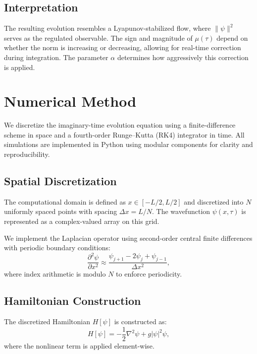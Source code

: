 \documentclass[12pt]{article}
\begin{document}
\subsection*{Interpretation}

The resulting evolution resembles a Lyapunov-stabilized flow, where $\|\psi\|^2$ serves as the regulated observable. The sign and magnitude of $\mu(\tau)$ depend on whether the norm is increasing or decreasing, allowing for real-time correction during integration. The parameter $\alpha$ determines how aggressively this correction is applied.

\section{Numerical Method}

We discretize the imaginary-time evolution equation using a finite-difference scheme in space and a fourth-order Runge--Kutta (RK4) integrator in time. All simulations are implemented in Python using modular components for clarity and reproducibility.

\subsection*{Spatial Discretization}

The computational domain is defined as $x \in [-L/2, L/2]$ and discretized into $N$ uniformly spaced points with spacing $\Delta x = L / N$. The wavefunction $\psi(x,\tau)$ is represented as a complex-valued array on this grid.

We implement the Laplacian operator using second-order central finite differences with periodic boundary conditions:
\begin{equation}
\frac{\partial^2 \psi}{\partial x^2} \approx \frac{\psi_{j+1} - 2\psi_j + \psi_{j-1}}{\Delta x^2},
\end{equation}
where index arithmetic is modulo $N$ to enforce periodicity.

\subsection*{Hamiltonian Construction}

The discretized Hamiltonian $H[\psi]$ is constructed as:
\begin{equation}
H[\psi] = -\frac{1}{2} \nabla^2 \psi + g |\psi|^2 \psi,
\end{equation}
where the nonlinear term is applied element-wise.
\end{document}
